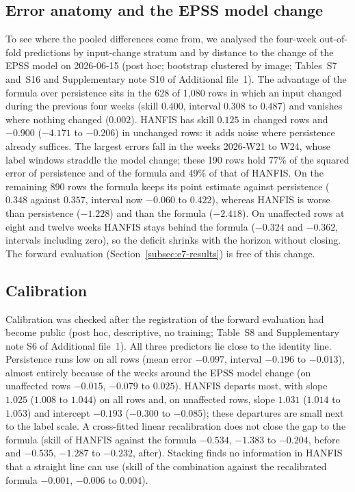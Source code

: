 \documentclass[referee,lineno,pdflatex,sn-basic]{sn-jnl}%
\theoremstyle{thmstyleone}%
\theoremstyle{thmstyletwo}%
\theoremstyle{thmstylethree}%
\begin{document}
\subsection{Error anatomy and the EPSS model change}\label{subsec:e16}
To see where the pooled differences come from, we analysed the four-week out-of-fold predictions by input-change stratum and by distance to the change of the EPSS model on 2026-06-15 (post hoc; bootstrap clustered by image; Tables~S7 and~S16 and Supplementary note S10 of Additional file~1). The advantage of the formula over persistence sits in the 628 of 1{,}080 rows in which an input changed during the previous four weeks (skill $0.400$, interval $0.308$ to $0.487$) and vanishes where nothing changed ($0.002$). HANFIS has skill $0.125$ in changed rows and $-0.900$ ($-4.171$ to $-0.206$) in unchanged rows: it adds noise where persistence already suffices. The largest errors fall in the weeks 2026-W21 to W24, whose label windows straddle the model change; these 190 rows hold 77\% of the squared error of persistence and of the formula and 49\% of that of HANFIS. On the remaining 890 rows the formula keeps its point estimate against persistence ($0.348$ against $0.357$, interval now $-0.060$ to $0.422$), whereas HANFIS is worse than persistence ($-1.228$) and than the formula ($-2.418$). On unaffected rows at eight and twelve weeks HANFIS stays behind the formula ($-0.324$ and $-0.362$, intervals including zero), so the deficit shrinks with the horizon without closing. The forward evaluation (Section~\ref{subsec:e7-results}) is free of this change.

\subsection{Calibration}\label{subsec:e21}
Calibration was checked after the registration of the forward evaluation had become public (post hoc, descriptive, no training; Table~S8 and Supplementary note S6 of Additional file~1). All three predictors lie close to the identity line. Persistence runs low on all rows (mean error $-0.097$, interval $-0.196$ to $-0.013$), almost entirely because of the weeks around the EPSS model change (on unaffected rows $-0.015$, $-0.079$ to $0.025$). HANFIS departs most, with slope $1.025$ ($1.008$ to $1.044$) on all rows and, on unaffected rows, slope $1.031$ ($1.014$ to $1.053$) and intercept $-0.193$ ($-0.300$ to $-0.085$); these departures are small next to the label scale. A cross-fitted linear recalibration does not close the gap to the formula (skill of HANFIS against the formula $-0.534$, $-1.383$ to $-0.204$, before and $-0.535$, $-1.287$ to $-0.232$, after). Stacking finds no information in HANFIS that a straight line can use (skill of the combination against the recalibrated formula $-0.001$, $-0.006$ to $0.004$).
\end{document}

